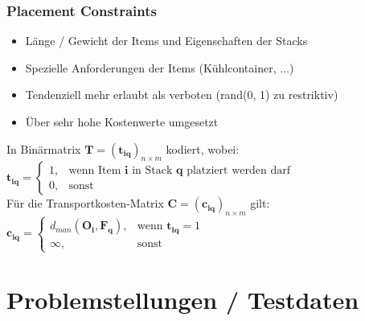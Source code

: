 \documentclass{beamer}
\begin{document}
\begin{frame}
\frametitle{Placement Constraints}
\begin{itemize}
    \item Länge / Gewicht der Items und Eigenschaften der Stacks
    \item Spezielle Anforderungen der Items (Kühlcontainer, ...)
    \item Tendenziell mehr erlaubt als verboten (rand(0, 1) zu restriktiv)
    \item Über sehr hohe Kostenwerte umgesetzt\newline
\end{itemize}
In Binärmatrix $\boldsymbol{T} = (\boldsymbol{t_{iq}})_{n \times m}$ kodiert, wobei:
$
    \boldsymbol{t_{iq}} =
\begin{cases}
    1, & \text{wenn Item $\boldsymbol{i}$ in Stack $\boldsymbol{q}$ platziert werden darf }\\
    0, & \text{sonst}
\end{cases}
$
\\[20pt]
Für die Transportkosten-Matrix $\boldsymbol{C} = (\boldsymbol{c_{iq}})_{n \times m}$ gilt:
$
    \boldsymbol{c_{iq}} =
\begin{cases}
    d_{man}(\boldsymbol{O_i}, \boldsymbol{F_q}), & \text{wenn $\boldsymbol{t_{iq}} = 1$}\\
    \infty, & \text{sonst}
\end{cases}
$
\end{frame}

\section{Problemstellungen / Testdaten}
\end{document}

